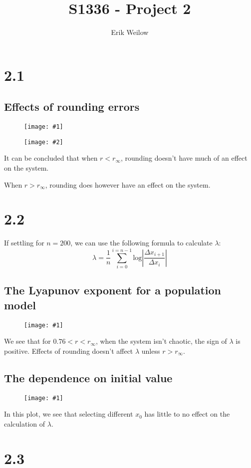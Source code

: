 \documentclass[11pt]{article}
\title{S1336 - Project 2}
\author{Erik Weilow}
\newcommand{\doublefigure}[2]{
\begin{figure}[H]
  \centering
  \begin{minipage}{0.45\textwidth}
    \centering
    \texttt{[image: \#1]}
  \end{minipage}
  \begin{minipage}{0.45\textwidth}
    \centering
    \texttt{[image: \#2]}
  \end{minipage}
\end{figure}
}
\newcommand{\singlefigure}[1]{
\begin{figure}[H]
  \centering
  \begin{minipage}{0.4\textwidth}
    \centering
    \texttt{[image: \#1]}
  \end{minipage}
\end{figure}
}
\begin{document}
\maketitle
\newpage

\section*{2.1}

\subsection*{Effects of rounding errors}
\doublefigure{./plots/2_1/r06.png}{./plots/2_1/r091.png}

It can be concluded that when $r < r_\infty$, rounding doesn't have much of an effect on the system.

When $r > r_\infty$, rounding does however have an effect on the system.

\section*{2.2}

If settling for $n=200$, we can use the following formula to calculate $\lambda$:
$$
\lambda = \frac{1}{n} \sum_{i=0}^{i=n-1}{\text{log}\left| \frac{\Delta x_{i+1}}{\Delta x_i}\right|}
$$

\begin{multicols}{2}

\subsection*{The Lyapunov exponent for a population model}
\singlefigure{./plots/2_2/study.png}
We see that for $0.76 < r < r_\infty$, when the system isn't chaotic, the sign of $\lambda$ is positive.
Effects of rounding doesn't affect $\lambda$ unless $r > r_\infty$.
\columnbreak

\subsection*{The dependence on initial value}
\singlefigure{./plots/2_2/dependence.png}
In this plot, we see that selecting different $x_0$ has little to no effect on the calculation of $\lambda$.

\end{multicols}

\section*{2.3}
\end{document}
